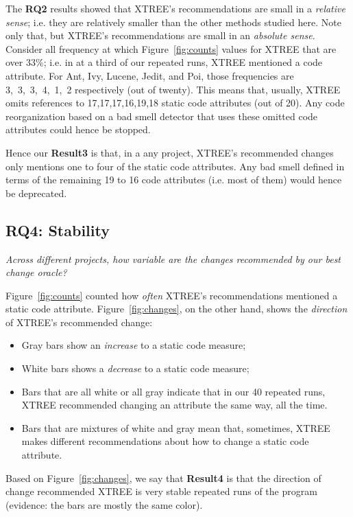 \documentclass[twocolumn,5p]{elsarticle}
\newcommand{\bi}{\begin{itemize}[leftmargin=0.4cm]}
\newcommand{\ei}{\end{itemize}}
\newcommand{\fig}[1]{Figure~\ref{fig:#1}}
\theoremstyle{break}
\begin{document}
\begin{itemize}
		The {\bf RQ2} results showed that XTREE's recommendations are small in a {\em relative sense}; i.e. they are 
		relatively smaller than the other methods studied here.
		Note only that, but XTREE's recommendations are small in an {\em absolute sense}.
		Consider all frequency at which  \fig{counts} values for XTREE that are over 33\%; i.e. in at a third of our  repeated runs, XTREE mentioned
		a code attribute. For Ant, Ivy, Lucene, Jedit, and Poi, those frequencies
		are  \mbox{3, 3, 3, 4, 1, 2} respectively (out of twenty). This means that, usually, XTREE omits references to \mbox{17,17,17,16,19,18} static
		code attributes (out of 20). 
		Any code reorganization based on a bad smell detector that uses  these omitted code attributes could hence  be stopped.
		
		Hence our {\bf Result3} is that, in a any  project,  XTREE's  recommended  changes  only  mentions one to four 
		of the  static code attributes.  Any bad smell defined in terms of the remaining 19 to 16 code attributes (i.e. most of them)
		would hence be deprecated.
		
		
		\subsection{RQ4: Stability}
		
		{\em Across different projects, how variable are the changes recommended by our best change oracle? }
		
		
		\fig{counts} counted how {\em often} XTREE's recommendations mentioned a static code attribute.
		\fig{changes}, on the other hand, shows the {\em direction} of XTREE's recommended change:
		\bi
		\item Gray bars show  an  {\em increase} to a static code measure;
		\item White bars shows a   {\em decrease} to a static code measure;
		\item Bars that are all white or all gray indicate that in our 40 repeated runs, XTREE recommended changing an attribute the same way, all the time.
		\item Bars that are mixtures of white and gray mean that, sometimes, XTREE makes different recommendations about how to change a static
		code attribute.
		\ei
		Based on \fig{changes}, we say that {\bf Result4} is that the direction of change recommended  XTREE is  very stable repeated runs of the program  (evidence:
		the bars are mostly the same color).
		

\end{itemize}
\end{document}
